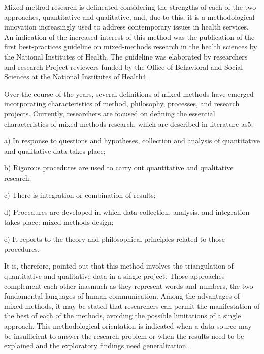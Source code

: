 Mixed-method research is delineated considering the strengths of each of the two approaches, quantitative and qualitative, and, due to this, it is a methodological innovation increasingly used to address contemporary issues in health services. An indication of the increased interest of this method was the publication of the first best-practices guideline on mixed-methods research in the health sciences by the National Institutes of Health. The guideline was elaborated by researchers and research Project reviewers funded by the Office of Behavioral and Social Sciences at the National Institutes of Health4.

Over the course of the years, several definitions of mixed methods have emerged incorporating characteristics of method, philosophy, processes, and research projects. Currently, researchers are focused on defining the essential characteristics of mixed-methods research, which are described in literature as5:

a) In response to questions and hypotheses, collection and analysis of quantitative and qualitative data takes place;

b) Rigorous procedures are used to carry out quantitative and qualitative research;

c) There is integration or combination of results;

d) Procedures are developed in which data collection, analysis, and integration takes place: mixed-methods design;

e) It reports to the theory and philosophical principles related to those procedures.

It is, therefore, pointed out that this method involves the triangulation of quantitative and qualitative data in a single project. Those approaches complement each other inasmuch as they represent words and numbers, the two fundamental languages of human communication. Among the advantages of mixed methods, it may be stated that researchers can permit the manifestation of the best of each of the methods, avoiding the possible limitations of a single approach. This methodological orientation is indicated when a data source may be insufficient to answer the research problem or when the results need to be explained and the exploratory findings need generalization.

